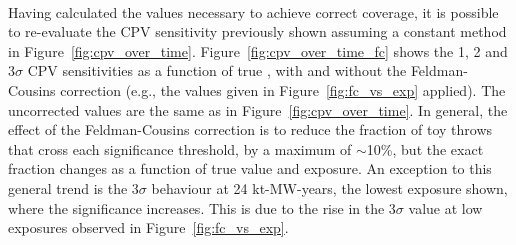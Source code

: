\begin{figure*}[htbp]
  \centering
  \\
  \caption{Fraction of throws for which the DUNE sensitivity to CP-violation ($\deltacp \neq [0,\pm\pi]$) exceeds 1--3$\sigma$ significance, calculated using constant-\dchisq (dashed lines) and \dchisqcrit values calculated using the Feldman-Cousins method (shaded histograms), as a function of the true value of \deltacp. Shown for NO, for a number of different exposures. The number of throws used to make each figure is also shown.}
  \label{fig:cpv_over_time_fc}
\end{figure*}
Having calculated the \dchisqcrit values necessary to achieve correct coverage, it is possible to re-evaluate the CPV sensitivity previously shown assuming a constant \dchisq method in Figure~\ref{fig:cpv_over_time}. Figure~\ref{fig:cpv_over_time_fc} shows the 1, 2 and 3$\sigma$ CPV sensitivities as a function of true \deltacp, with and without the Feldman-Cousins correction (e.g., the \dchisqcrit values given in Figure~\ref{fig:fc_vs_exp} applied). The uncorrected values are the same as in Figure~\ref{fig:cpv_over_time}. In general, the effect of the Feldman-Cousins correction is to reduce the fraction of toy throws that cross each significance threshold, by a maximum of $\sim$10\%, but the exact fraction changes as a function of true \deltacp value and exposure. An exception to this general trend is the 3$\sigma$ behaviour at 24 kt-MW-years, the lowest exposure shown, where the significance increases. This is due to the rise in the 3$\sigma$ \dchisqcrit value at low exposures observed in Figure~\ref{fig:fc_vs_exp}.

